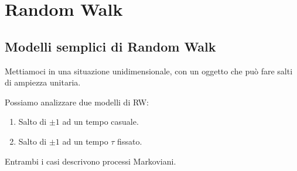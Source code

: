 \section{Random Walk}%
\label{sub:Lezione 6}
\mylocaltoc
\subsection{Modelli semplici di Random Walk}%
\label{sub:Random Walk}

Mettiamoci in una situazione unidimensionale, con un oggetto che può fare salti di ampiezza unitaria.

Possiamo analizzare due modelli di RW:
\begin{enumerate}
    \item Salto di $\pm 1$ ad un tempo casuale.
    \item Salto di $\pm 1$ ad un tempo $\tau$ fissato.
\end{enumerate}
Entrambi i casi descrivono processi Markoviani.

